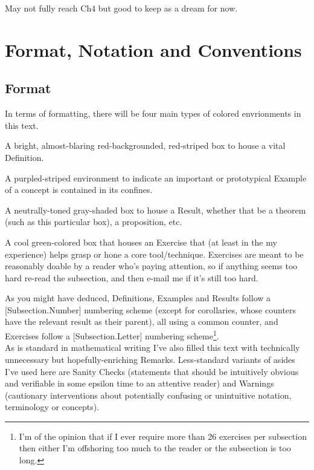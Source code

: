 \documentclass[11pt, x11names, openany]{book}
\newcounter{exercises}
\begin{document}
 May not fully reach Ch4 but good to keep as a dream for now.



\newpage

\section*{Format, Notation and Conventions}
\label{section: Format, Notation and Conventions}

\subsection*{Format}
In terms of formatting, there will be four main types of colored envrionments in this text.
\begin{defn} 
    A bright, almost-blaring red-backgrounded, red-striped box to house a vital Definition.
\end{defn}
\begin{example}
    A purpled-striped environment to indicate an important or prototypical Example of a concept is contained in its confines.
\end{example}
\begin{theorem}
    A neutrally-toned gray-shaded box to house a Result, whether that be a theorem (such as this particular box), a proposition, etc.
\end{theorem}
\begin{exercise}
    A cool green-colored box that houses an Exercise that (at least in the my experience) helps grasp or hone a core tool/technique. Exercises are meant to be reasonably doable by a reader who's paying attention, so if anything seems too hard re-read the subsection, and then e-mail me if it's still too hard.
\end{exercise}

As you might have deduced, Definitions, Examples and Results follow a [Subsection.Number] numbering scheme (except for corollaries, whose counters have the relevant result as their parent), all using a common counter, and Exercises follow a [Subsection.Letter] numbering scheme\footnote{I'm of the opinion that if I ever require more than 26 exercises per subsection then either I'm offshoring too much to the reader or the subsection is too long.}.\\

As is standard in mathematical writing I've also filled this text with technically unnecessary but hopefully-enriching Remarks. Less-standard variants of asides I've used here are Sanity Checks (statements that should be intuitively obvious and verifiable in some epsilon time to an attentive reader) and Warnings (cautionary interventions about potentially confusing or unintuitive notation, terminology or concepts).\\
\end{document}

